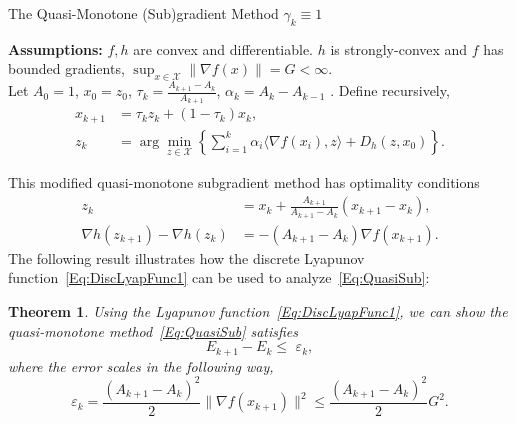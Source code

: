 \documentclass[11pt]{article}
\theoremstyle{plain}
\newtheorem{theorem}{Theorem}
\newcommand{\X}{{\mathcal X}}
\begin{document}
\begin{algorithm}[H]
\caption{The Quasi-Monotone (Sub)gradient Method $\gamma_k \equiv 1$}
{\bf Assumptions:} $f, h$ are convex and differentiable. $h$ is strongly-convex and $f$ has bounded gradients, $\sup_{x\in\X}\|\nabla f(x)\| = G <\infty$. \\
Let $A_0 = 1$, $x_0 = z_0$, $\tau_k = \frac{A_{k+1} - A_k}{A_{k+1}}$, $\alpha_k = A_{k} - A_{k-1}$ . Define recursively,
\begin{subequations}\label{Eq:QuasiSub1}
\begin{align}
x_{k+1} &= \tau_k z_k + (1 - \tau_k)x_{k} ,\label{Eq:ZSeqQuasi1}\\
z_k &= \arg \min_{z\in \X} \left\{ \sum_{i=1}^k \alpha_i \langle \nabla f(x_i), z\rangle + D_h(z, x_0)\right\} \label{Eq:XSeqQuasi1}.
\end{align} 
\end{subequations}
\end{algorithm}
\noindent This modified quasi-monotone subgradient method has optimality conditions
\begin{subequations}\label{Eq:QuasiSub}
\begin{align}
z_{k} &= x_{k} + \frac{A_{k+1}}{A_{k+1} -A_{k}} (x_{k+1} - x_k),\label{Eq:ZSeqQuasi}\\
\nabla h(z_{k+1}) -\nabla h(z_k) &= -(A_{k+1} - A_{k})\nabla f(x_{k+1})\label{Eq:XSeqQuasi}.
\end{align} 
\end{subequations}
The following result illustrates how the discrete Lyapunov function~\eqref{Eq:DiscLyapFunc1} can be used to analyze~\eqref{Eq:QuasiSub}:
\begin{theorem}
\label{Thm:Quasi}
Using the Lyapunov function~\eqref{Eq:DiscLyapFunc1},
we can show the quasi-monotone method~\eqref{Eq:QuasiSub} satisfies \[E_{k+1} - E_k \leq \,\,\varepsilon_k,\] where the error scales in the following way,%
\[\varepsilon_k = \frac{(A_{k+1}- A_k)^2}{2}\|\nabla f(x_{k+1})\|^2 \leq \frac{(A_{k+1}- A_k)^2}{2}G^2.\]
\end{theorem}
\end{document}
